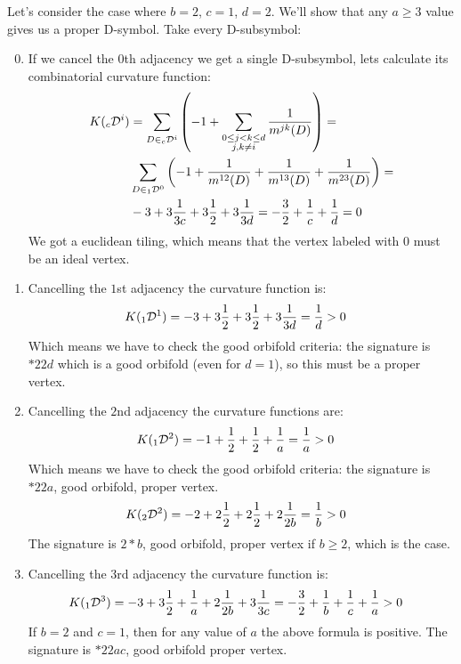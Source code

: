 \documentclass[12pt,a4paper]{article}
\newcommand{\leftsub}[2]{{\vphantom{#2}}_{#1}{#2}}
\theoremstyle{plain}%
\theoremstyle{definition}
\theoremstyle{remark}
\begin{document}
Let's consider the case where $b=2$, $c=1$, $d=2$. We'll show that any $a\geq3$ value
gives us a proper D-symbol. Take every D-subsymbol:
\begin{enumerate}
  \setcounter{enumi}{-1}
  \item If we cancel the $0$th adjacency we get a single D-subsymbol, lets
    calculate its combinatorial curvature function:
    \begin{align*}
      K(\leftsub{c}{\mathcal{D}^i})&=\sum_{D\in
      \leftsub{c}{\mathcal{D}^i}}\left(-1+\sum_{\substack{0\le j<k\le d \\ j,k\ne i}}\frac{1}{m^{jk}(D)}\right)= \\
      &
      \sum_{D\in\leftsub{1}{\mathcal{D}^0}}\left(-1+\frac{1}{m^{12}(D)}+\frac{1}{m^{13}(D)}+\frac{1}{m^{23}(D)}\right)= \\
      & -3 + 3\frac{1}{3c} + 3\frac{1}{2} + 3\frac{1}{3d} = -\frac{3}{2}+\frac{1}{c}+\frac{1}{d} = 0
    \end{align*}
    We got a euclidean tiling, which means that the vertex labeled with $0$ must
    be an ideal vertex.
  \item Cancelling the $1$st adjacency the curvature function is:
    \begin{align*}
      K(\leftsub{1}{\mathcal{D}^1})&= -3 + 3\frac{1}{2} + 3\frac{1}{2} +
      3\frac{1}{3d} = \frac{1}{d} > 0
    \end{align*}
    Which means we have to check the good orbifold criteria: the signature is
    $*22d$ which is a good orbifold (even for $d=1$), so this must be a proper vertex.
  \item Cancelling the $2$nd adjacency the curvature functions are:
    \begin{align*}
      K(\leftsub{1}{\mathcal{D}^2})&= -1 + \frac{1}{2} + \frac{1}{2} +
      \frac{1}{a} = \frac{1}{a} > 0
    \end{align*}
    Which means we have to check the good orbifold criteria: the signature is
    $*22a$, good orbifold, proper vertex.
    \begin{align*}
      K(\leftsub{2}{\mathcal{D}^2})&= -2 + 2\frac{1}{2} + 2\frac{1}{2} +
      2\frac{1}{2b} = \frac{1}{b} > 0
    \end{align*}
    The signature is $2*b$, good orbifold, proper vertex if $b\geq2$, which is
    the case.
  \item Cancelling the $3$rd adjacency the curvature function is:
    \begin{align*}
      K(\leftsub{1}{\mathcal{D}^3})&= -3 + 3\frac{1}{2} + \frac{1}{a} +
      2\frac{1}{2b} + 3\frac{1}{3c} =
       -\frac{3}{2} + \frac{1}{b} + \frac{1}{c} + \frac{1}{a} > 0
    \end{align*}
    If $b=2$ and $c=1$, then for any value of $a$ the above formula is positive.
    The signature is $*22ac$, good orbifold proper vertex.
\end{enumerate}
\end{document}
